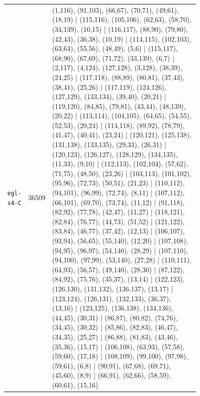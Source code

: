 \begin{landscape}
\begin{longtable}{lr>{\tiny\raggedright\arraybackslash}p{0.78\linewidth}}
\texttt{egl-s4-C} & 36509 & (1,116), (91,103), (66,67), (70,71), (49,61), (18,19) | (115,116), (105,106), (62,63), (58,70), (34,139), (10,15) | (116,117), (88,90), (79,80), (42,43), (36,38), (10,19) | (114,115), (102,103), (63,64), (55,56), (48,49), (5,6) | (115,117), (68,90), (67,69), (71,72), (33,139), (6,7) | (2,117), (4,124), (127,128), (3,128), (38,39), (24,25) | (117,118), (88,89), (80,81), (37,43), (38,41), (25,26) | (117,119), (124,126), (127,129), (133,134), (39,40), (20,21) | (119,120), (84,85), (79,81), (43,44), (48,139), (20,22) | (113,114), (104,105), (64,65), (54,55), (52,53), (20,24) | (114,118), (89,92), (78,79), (41,47), (40,41), (23,24) | (120,121), (125,138), (131,138), (133,135), (29,33), (26,31) | (120,123), (126,127), (128,129), (134,135), (11,33), (9,10) | (112,113), (102,104), (57,62), (71,75), (48,50), (23,26) | (103,113), (101,102), (95,96), (72,73), (50,51), (21,23) | (110,112), (94,101), (96,99), (72,74), (8,11) | (107,112), (66,101), (69,70), (73,74), (11,12) | (91,118), (82,92), (77,78), (42,47), (11,27) | (118,121), (82,84), (76,77), (44,73), (51,52) | (121,122), (83,84), (46,77), (37,42), (12,13) | (106,107), (93,94), (56,65), (55,140), (12,20) | (107,108), (94,95), (96,97), (54,140), (28,29) | (107,110), (94,100), (97,99), (53,140), (27,28) | (110,111), (64,93), (56,57), (49,140), (28,30) | (87,122), (84,92), (75,76), (35,37), (13,14) | (122,123), (126,130), (131,132), (136,137), (13,17) | (123,124), (126,131), (132,133), (36,37), (13,16) | (123,125), (136,138), (134,136), (44,45), (30,31) | (86,87), (80,82), (74,76), (34,45), (30,32) | (85,86), (82,83), (46,47), (34,35), (25,27) | (86,88), (81,83), (43,46), (35,36), (15,17) | (106,108), (63,93), (57,58), (59,60), (17,18) | (108,109), (99,100), (97,98), (59,61), (6,8) | (90,91), (67,68), (69,71), (45,60), (8,9) | (66,91), (62,66), (58,59), (60,61), (15,16) \\[2pt]
\end{longtable}
\endgroup
\end{landscape}
\restoregeometry